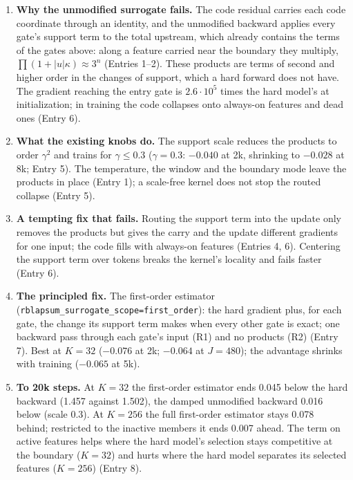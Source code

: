 \documentclass[11pt,a4paper]{article}
\newcommand{\code}[1]{\texttt{#1}}
\begin{document}
\begin{enumerate}[leftmargin=1.4em]
\item \textbf{Why the unmodified surrogate fails.}  The code residual carries each code coordinate through an
  identity, and the unmodified backward applies every gate's support term to the total upstream, which already
  contains the terms of the gates above: along a feature carried near the boundary they multiply,
  \(\prod(1+|u|\kappa)\approx3^n\) (Entries 1--2).  These products are terms of second and higher order in the changes
  of support, which a hard forward does not have.  The gradient reaching the entry gate is \(2.6\cdot10^5\) times the
  hard model's at initialization; in training the code collapses onto always-on features and dead ones (Entry 6).
\item \textbf{What the existing knobs do.}  The support scale reduces the products to order \(\gamma^2\) and trains for
  \(\gamma\le0.3\) (\(\gamma=0.3\): \(-0.040\) at 2k, shrinking to \(-0.028\) at 8k; Entry 5).  The temperature, the window and
  the boundary mode leave the products in place (Entry 1); a scale-free kernel does not stop the routed collapse
  (Entry 5).
\item \textbf{A tempting fix that fails.}  Routing the support term into the update only removes the products but
  gives the carry and the update different gradients for one input; the code fills with always-on features
  (Entries 4, 6).  Centering the support term over tokens breaks the kernel's locality and fails faster (Entry 6).
\item \textbf{The principled fix.}  The first-order estimator (\code{rblapsum\_surrogate\_scope=first\_order}): the hard
  gradient plus, for each gate, the change its support term makes when every other gate is exact; one backward pass
  through each gate's input (R1) and no products (R2) (Entry 7).  Best at \(K=32\) (\(-0.076\) at 2k; \(-0.064\) at
  \(J=480\)); the advantage shrinks with training (\(-0.065\) at 5k).
\item \textbf{To 20k steps.}  At \(K=32\) the first-order estimator ends 0.045 below the hard backward (1.457 against
  1.502), the damped unmodified backward 0.016 below (scale 0.3).  At \(K=256\) the full first-order estimator stays
  0.078 behind; restricted to the inactive members it ends 0.007 ahead.  The term on active features helps where the
  hard model's selection stays competitive at the boundary (\(K=32\)) and hurts where the hard model separates its
  selected features (\(K=256\)) (Entry 8).
\end{enumerate}
\end{document}
